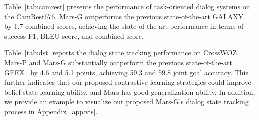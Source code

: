 Table~\ref{tab:camrest} presents the performance of task-oriented dialog systems on the CamRest676. Mars-G outperforms the previous state-of-the-art GALAXY~\cite{DBLP:journals/corr/abs-2111-14592} by 1.7 combined scores, achieving the state-of-the-art performance in terms of success F1, BLEU score, and combined score. %

\begin{table}[!t]
  \centering
  \caption{Comparison of dialog state tracking performance on CrossWOZ.\label{tab:dst}}
\end{table}

Table~\ref{tab:dst} reports the dialog state tracking performance  on CrossWOZ.   Mars-P and Mars-G substantially outperform the previous state-of-the-art GEEX~\cite{li-etal-2021-generation}  by  4.6 and 5.1 points, achieving 59.3 and 59.8 joint goal accuracy. This further indicates that our proposed  contrastive learning strategies could improve belief state learning ability, and Mars has good generalization ability. In addition, we provide an example to visualize  our proposed Mars-G's dialog state tracking process in  Appendix~\ref{app:vis}.

